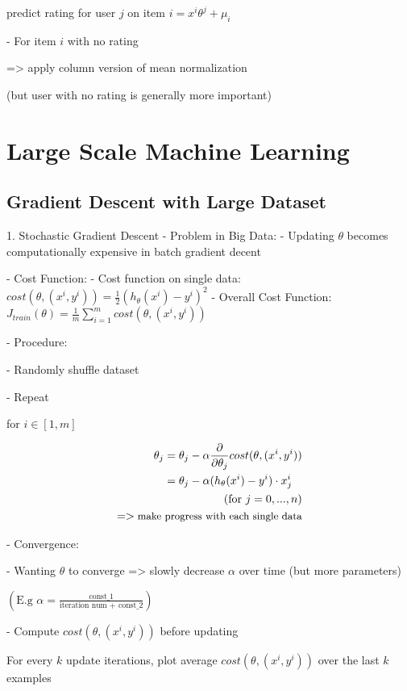 	predict rating for user $j$ on item $i = x^i\theta^j + \mu_i$ 

- For item $i$ with no rating

=> apply column version of mean normalization

(but user with no rating is generally more important)

\section{Large Scale Machine Learning}

\subsection{Gradient Descent with Large Dataset}

1. Stochastic Gradient Descent
- Problem in Big Data: 
- Updating $\theta$ becomes computationally expensive in batch gradient decent

- Cost Function: 
- Cost function on single data: $cost(\theta, (x^i,y^i)) = \frac 1 2 (h_\theta(x^i)-y^i)^2$ 
- Overall Cost Function: $\displaystyle J_{train}(\theta) = \frac 1 m \sum_{i=1}^m cost(\theta, (x^i,y^i))$

- Procedure:

- Randomly shuffle dataset

- Repeat

	for $i \in [1,m]$ 

		\begin{align}\begin{split} \displaystyle \theta_j &= \theta_j - \alpha \frac {\partial }{\partial \theta_j} cost(\theta,(x^i,y^i)) \\ \displaystyle &= \theta_j - \alpha \space (h_\theta(x^i)-y^i) \cdot  x^i_j \end{split} \\ \text{(for $j=0,...,n$)} \\ \small => \text{make progress with each single data} \end{align}

- Convergence:

- Wanting $\theta$ to converge => slowly decrease $\alpha$ over time (but more parameters)

\( ( \displaystyle \text{E.g } \alpha = \frac {\text{const\_1}} {\text{iteration num + const\_2}} ) \)

- Compute $cost(\theta,(x^i,y^i))$ before updating 

For every $k$ update iterations, plot average $cost(\theta,(x^i,y^i))$ over the last $k$ examples

